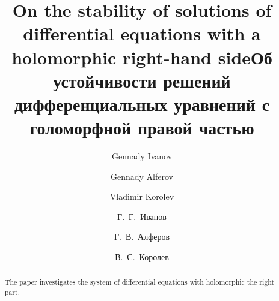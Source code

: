 \begin{englishtitle} %
\title{On the stability of solutions of differential equations with a holomorphic right-hand side}
\author{Gennady Ivanov   \and  Gennady  Alferov  \and  Vladimir  Korolev 
}

\maketitle

\begin{abstract}
The paper investigates the system of differential equations with holomorphic
the right part. 


\end{abstract}
\end{englishtitle}


\iffalse
\documentclass[12pt]{llncs}


\usepackage{iftex}

\ifPDFTeX
\usepackage[T2A]{fontenc}
\usepackage[utf8]{inputenc} %
\usepackage[english,russian]{babel}
\fi

\usepackage{todonotes}

\usepackage[russian]{nla}



\fi

\title{Об  устойчивости решений дифференциальных уравнений с  голоморфной правой частью }
\author{Г.~Г.~Иванов  \and    Г.~В.~Алферов  \and  В.~С.~Королев
} %


